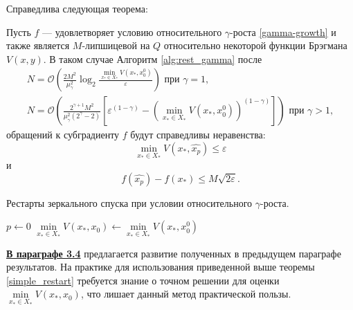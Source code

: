 Справедлива следующая теорема:
\begin{theorem} \label{simple_restart}
    Пусть $f$ --- удовлетворяет условию относительного $\gamma$-роста \eqref{gamma-growth} и также является $M$-липшицевой на $Q$ относительно некоторой функции Брэгмана $V(x, y)$. В таком случае Алгоритм \ref{alg:rest_gamma} после 
    \begin{equation}
    \begin{aligned}
       N =\mathcal{O}\left(\frac{2 M^2}{\mu_{\gamma}^2} \log_2{\frac{\min\limits_{x_* \in X_*}{V(x_*, x_0^0)}}{\varepsilon}}\right) \text{ при } \gamma = 1, \\
       N = \mathcal{O}\left(\frac{2^{\gamma + 1} M^2}{\mu_{\gamma}^2 (2^{\gamma} - 2)} \left[\varepsilon^{(1 - \gamma)} - \left(\min\limits_{x_* \in X_*}{V(x_*, x_0^0)}\right)^{(1 - \gamma)}\right]\right) \text{ при } \gamma > 1,
    \end{aligned}
    \end{equation}
    обращений к субградиенту $f$ будут справедливы неравенства:
    \begin{equation}
        \min_{x_* \in X_*}{V(x_*, \widehat{x_p})} \leq \varepsilon
    \end{equation}
    и
    \begin{equation}
        f(\widehat{x_p}) - f(x_*) \leq M \sqrt{2 \varepsilon}.  
    \end{equation}
\end{theorem}

\begin{algorithm}[htp]
    \caption{Рестарты зеркального спуска при условии относительного $\gamma$-роста.}
    \label{alg:rest_gamma}
    $p \gets 0$\;
    $\min\limits_{x_* \in X_*}{V(x_*, x_0)} \gets \min\limits_{x_* \in X_*}{V(x_*,x_0^0)}$\;
\end{algorithm}


\underline{\textbf{В параграфе 3.4}} предлагается развитие полученных в предыдущем параграфе результатов. На практике для использования приведенной выше теоремы \ref{simple_restart} требуется знание о точном решении для оценки $\min\limits_{x_* \in X_*}{V(x_*, x_0)}$, что лишает данный метод практической пользы. 

